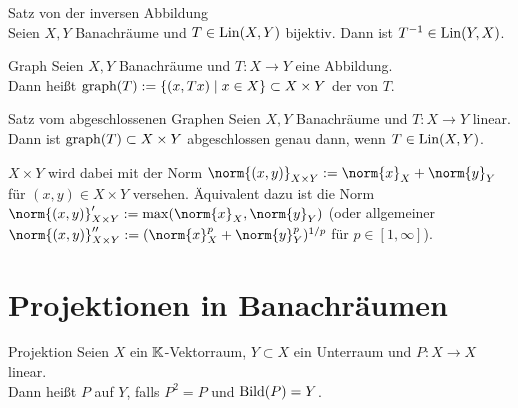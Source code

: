 \begin{Satz}{Satz von der inversen Abbildung}\\
    Seien $X, Y$ Banachräume und $T \in \operatorname{Lin}(X, Y)$ bijektiv.
    Dann ist $T^{-1} \in \operatorname{Lin}(Y, X)$.
\end{Satz}

\linie

\begin{Def}{Graph}
    Seien $X, Y$ Banachräume und $T\colon X \rightarrow Y$ eine Abbildung.\\
    Dann heißt
    $\text{graph}(T) := \{(x, Tx) \;|\; x \in X\} \subset X \times Y$ der  von $T$.
\end{Def}

\begin{Satz}{Satz vom abgeschlossenen Graphen}
    Seien $X, Y$ Banachräume und $T\colon X \rightarrow Y$ linear.\\
    Dann ist $\text{graph}(T) \subset X \times Y$ abgeschlossen genau dann, wenn $T \in \operatorname{Lin}(X, Y)$.
\end{Satz}

\begin{Bem}
    $X \times Y$ wird dabei mit der Norm $\norm{(x, y)}_{X \times Y} := \norm{x}_X + \norm{y}_Y$
    für $(x, y) \in X \times Y$ versehen.
    Äquivalent dazu ist die Norm $\norm{(x, y)}_{X \times Y}' := \max(\norm{x}_X, \norm{y}_Y)$
    (oder allgemeiner $\norm{(x, y)}_{X \times Y}'' := (\norm{x}_X^p + \norm{y}_Y^p)^{1/p}$
    für $p \in [1, \infty]$).
\end{Bem}

\pagebreak

\section{%
    Projektionen in Banachräumen%
}

\begin{Def}{Projektion}
    Seien $X$ ein $\mathbb{K}$-Vektorraum, $Y \subset X$ ein Unterraum und
    $P\colon X \rightarrow X$ linear.\\
    Dann heißt $P$  auf $Y$,
    falls $P^2 = P$ und $\text{Bild}(P) = Y$.
\end{Def}

